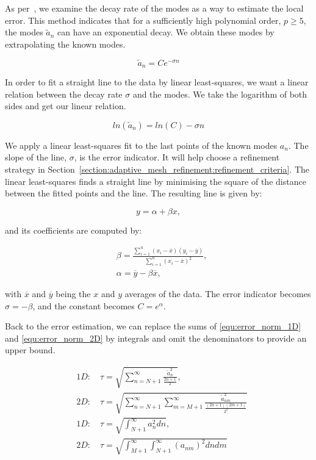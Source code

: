 As per~\cite{Mavriplis1990}, we examine the decay rate of the modes as a way to estimate the local
error. This method indicates that for a sufficiently high polynomial order, $p \geq 5$, the modes
$\widetilde{a}_n$ can have an exponential decay. We obtain these modes by extrapolating the known
modes. 

\begin{equation} \label{equ:exponential_decay}
	\widetilde{a}_n = Ce^{-\sigma n}
\end{equation}

In order to fit a straight line to the data by linear least-squares, we want a linear relation
between the decay rate $\sigma$ and the modes. We take the logarithm of both sides and get our
linear relation.

\begin{equation} \label{equ:exponential_decay_linear}
	ln(\widetilde{a}_n) = ln(C) - \sigma n
\end{equation}

We apply a linear least-squares fit to the last points of the known modes $a_n$. The slope of the
line, $\sigma$, is the error indicator. It will help choose a refinement strategy in
Section~\ref{section:adaptive_mesh_refinement:refinement_criteria}. The linear least-squares finds a
straight line by minimising the square of the distance between the fitted points and the line. The
resulting line is given by:

\begin{equation}
	y = \alpha + \beta x,
\end{equation}

and its coefficients are computed by:

\begin{align}
	& \beta = \frac{\sum_{i = 1}^{n}(x_i - \overline{x})(y_i - \overline{y})}{\sum_{i = 1}^{n}(x_i -\overline{x})^2}, \\
	& \alpha = \overline{y} - \beta \overline{x},
\end{align}

with $\overline{x}$ and $\overline{y}$ being the $x$ and $y$ averages of the data. The error
indicator becomes $\sigma = - \beta$, and the constant becomes $C = e^\alpha$.

Back to the error estimation, we can replace the sums of \ref{equ:error_norm_1D} and
\ref{equ:error_norm_2D} by integrals and omit the denominators to provide an upper bound.

\begin{align}
	&1D: \quad \tau = \sqrt{\sum_{n = N + 1}^{\infty } \frac{\widetilde{a}_n^2}{\frac{2n + 1}{2}}}, \label{equ:error_1D_sums}
	\\
	&2D: \quad \tau = \sqrt{\sum_{n = N + 1}^{\infty }\sum_{m = M + 1}^{\infty}\frac{\widetilde{a}^2_{nm}}{\frac{(2n + 1)(2m + 1)}{2^2}}} \label{equ:error_2D_sums}
	\\
	&1D: \quad \tau = \sqrt{\int_{N + 1}^{\infty } a_n^2 dn}, \label{equ:error_1D_integrals}
	\\
	&2D: \quad \tau = \sqrt{\int_{M+1}^{\infty }\int_{N + 1 }^{\infty}(a_{nm})^2 dn dm} \label{equ:error_2D_integrals}
\end{align}

